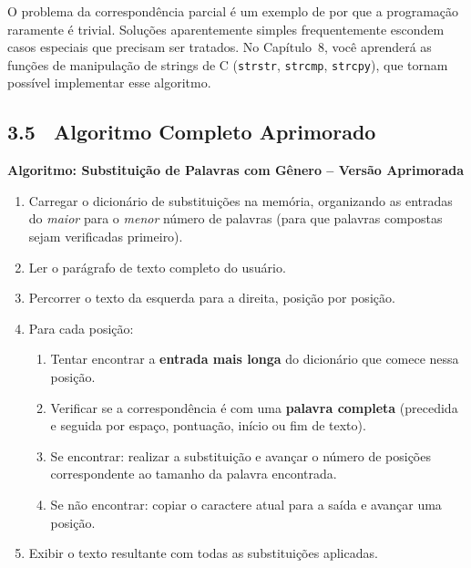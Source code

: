 \documentclass[12pt,a4paper]{article}
\begin{document}
\begin{atencao}
  O problema da correspondência parcial é um exemplo de por que a programação
  raramente é trivial. Soluções aparentemente simples frequentemente escondem
  casos especiais que precisam ser tratados. No Capítulo~8, você aprenderá as
  funções de manipulação de strings de C (\texttt{strstr}, \texttt{strcmp},
  \texttt{strcpy}), que tornam possível implementar esse algoritmo.
\end{atencao}

\bigskip

\subsection*{3.5 \ Algoritmo Completo Aprimorado}

\begin{algoritmo}
\textbf{Algoritmo: Substituição de Palavras com Gênero -- Versão Aprimorada}

\begin{enumerate}
  \item Carregar o dicionário de substituições na memória, organizando as entradas
  do \textit{maior} para o \textit{menor} número de palavras (para que palavras
  compostas sejam verificadas primeiro).

  \item Ler o parágrafo de texto completo do usuário.

  \item Percorrer o texto da esquerda para a direita, posição por posição.

  \item Para cada posição:
  \begin{enumerate}[label=\arabic*.]
    \item Tentar encontrar a \textbf{entrada mais longa} do dicionário que comece
    nessa posição.
    \item Verificar se a correspondência é com uma \textbf{palavra completa}
    (precedida e seguida por espaço, pontuação, início ou fim de texto).
    \item Se encontrar: realizar a substituição e avançar o número de posições
    correspondente ao tamanho da palavra encontrada.
    \item Se não encontrar: copiar o caractere atual para a saída e avançar
    uma posição.
  \end{enumerate}

  \item Exibir o texto resultante com todas as substituições aplicadas.
\end{enumerate}
\end{algoritmo}
\end{document}
